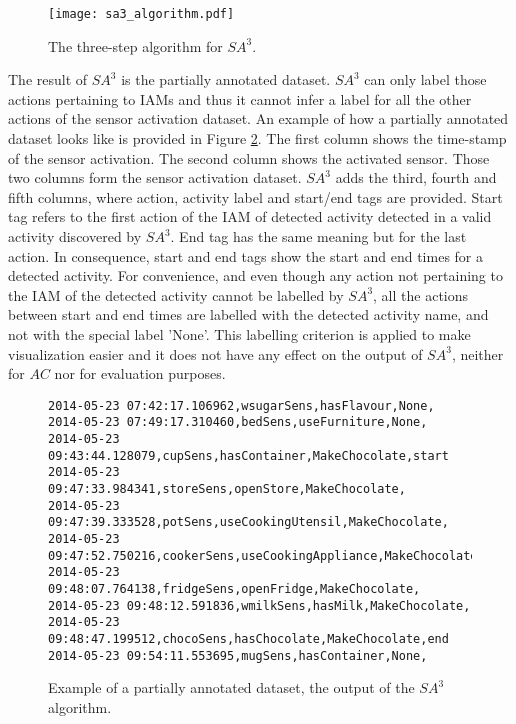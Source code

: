 \begin{figure}[htbp]
\centering
\texttt{[image: sa3\_algorithm.pdf]}
    \caption{The three-step algorithm for $SA^3$.}
    \label{fig:sa3_algorithm}
\end{figure}

The result of $SA^3$ is the partially annotated dataset. $SA^3$ can only label those actions pertaining to IAMs and thus it cannot infer a label for all the other actions of the sensor activation dataset. An example of how a partially annotated dataset looks like is provided in Figure \ref{fig-partially-annotated}. The first column shows the time-stamp of the sensor activation. The second column shows the activated sensor. Those two columns form the sensor activation dataset. $SA^3$ adds the third, fourth and fifth columns, where action, activity label and start/end tags are provided. Start tag refers to the first action of the IAM of detected activity detected in a valid activity discovered by $SA^3$. End tag has the same meaning but for the last action. In consequence, start and end tags show the start and end times for a detected activity. For convenience, and even though any action not pertaining to the IAM of the detected activity cannot be labelled by $SA^3$, all the actions between start and end times are labelled with the detected activity name, and not with the special label 'None'. This labelling criterion is applied to make visualization easier and it does not have any effect on the output of $SA^3$, neither for $AC$ nor for evaluation purposes.

\begin{figure}[htbp]
\begin{small}
\begin{lstlisting}
2014-05-23 07:42:17.106962,wsugarSens,hasFlavour,None,
2014-05-23 07:49:17.310460,bedSens,useFurniture,None,
2014-05-23 09:43:44.128079,cupSens,hasContainer,MakeChocolate,start
2014-05-23 09:47:33.984341,storeSens,openStore,MakeChocolate,
2014-05-23 09:47:39.333528,potSens,useCookingUtensil,MakeChocolate,
2014-05-23 09:47:52.750216,cookerSens,useCookingAppliance,MakeChocolate,
2014-05-23 09:48:07.764138,fridgeSens,openFridge,MakeChocolate,
2014-05-23 09:48:12.591836,wmilkSens,hasMilk,MakeChocolate,
2014-05-23 09:48:47.199512,chocoSens,hasChocolate,MakeChocolate,end
2014-05-23 09:54:11.553695,mugSens,hasContainer,None,
\end{lstlisting}
\end{small}
\caption{Example of a partially annotated dataset, the output of the $SA^3$ algorithm.}
\label{fig-partially-annotated}
\end{figure}


